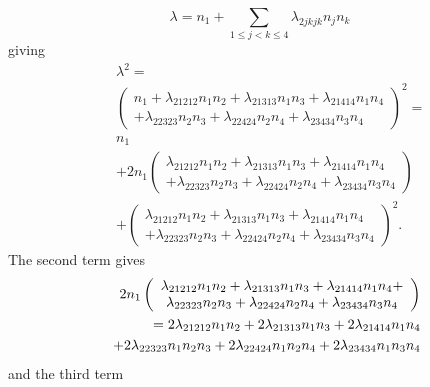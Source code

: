 \documentclass[12pt]{article}
\begin{document}
\begin{equation*}
\lambda =n_{1}+\sum_{1\leq j<k\leq 4}\lambda _{2jkjk}n_{j}n_{k}
\end{equation*}%
giving%
\begin{eqnarray*}
&&\lambda ^{2}= \\
&&\left( 
\begin{array}{c}
n_{1}+\lambda _{21212}n_{1}n_{2}+\lambda _{21313}n_{1}n_{3}+\lambda
_{21414}n_{1}n_{4} \\ 
+\lambda _{22323}n_{2}n_{3}+\lambda _{22424}n_{2}n_{4}+\lambda
_{23434}n_{3}n_{4}%
\end{array}%
\right) ^{2}= \\
&&n_{1} \\
&&+2n_{1}\left( 
\begin{array}{c}
\lambda _{21212}n_{1}n_{2}+\lambda _{21313}n_{1}n_{3}+\lambda
_{21414}n_{1}n_{4} \\ 
+\lambda _{22323}n_{2}n_{3}+\lambda _{22424}n_{2}n_{4}+\lambda
_{23434}n_{3}n_{4}%
\end{array}%
\right) \\
&&+\left( 
\begin{array}{c}
\lambda _{21212}n_{1}n_{2}+\lambda _{21313}n_{1}n_{3}+\lambda
_{21414}n_{1}n_{4} \\ 
+\lambda _{22323}n_{2}n_{3}+\lambda _{22424}n_{2}n_{4}+\lambda
_{23434}n_{3}n_{4}%
\end{array}%
\right) ^{2}.
\end{eqnarray*}%
The second term gives%
\begin{eqnarray}
&&2n_{1}\left( 
\begin{array}{c}
\lambda _{21212}n_{1}n_{2}+\lambda _{21313}n_{1}n_{3}+\lambda
_{21414}n_{1}n_{4}+ \\ 
\lambda _{22323}n_{2}n_{3}+\lambda _{22424}n_{2}n_{4}+\lambda
_{23434}n_{3}n_{4}%
\end{array}%
\right)  \notag \\
&&\left. =\right. 2\lambda _{21212}n_{1}n_{2}+2\lambda
_{21313}n_{1}n_{3}+2\lambda _{21414}n_{1}n_{4}  \notag \\
&&+2\lambda _{22323}n_{1}n_{2}n_{3}+2\lambda
_{22424}n_{1}n_{2}n_{4}+2\lambda _{23434}n_{1}n_{3}n_{4}  \notag
\end{eqnarray}%
and the third term 
\end{document}
